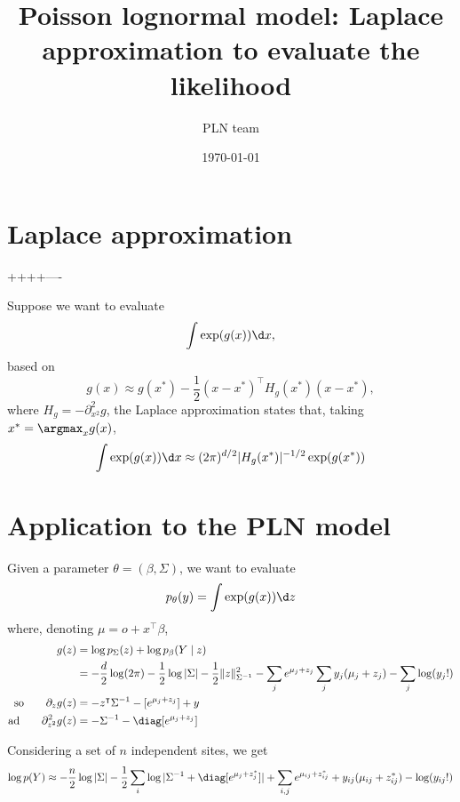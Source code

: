\documentclass{article}
\title{Poisson lognormal model: Laplace approximation to evaluate the likelihood}
\author{PLN team}
\date{\today}
\begin{document}
\maketitle

\section{Laplace approximation} ++++----

Suppose we want to evaluate
$$
\int \exp(g(x)) \d x, 
$$
based on 
$$
g(x) \approx g(x^*) - \frac12 (x - x^*)^\intercal H_g(x^*) (x - x^*),
$$
where $H_g = -\partial^2_{x^2} g$, the Laplace approximation states that, taking $x^* = \argmax_x g(x)$, 
$$
\int \exp(g(x)) \d x \approx (2\pi)^{d/2} |H_g(x^*)|^{-1/2} \exp(g(x^*))
$$

\section{Application to the PLN model}

Given a parameter $\theta = (\beta, \Sigma)$, we want to evaluate
$$
p_\theta(y) = \int \exp(g(x)) \d z
$$
where, denoting $\mu = o + x^\intercal \beta$,
\begin{align*}
 g(z) 
 & = \log p_\Sigma(z) + \log p_\beta(Y \mid z) \\
 & = - \frac{d}2 \log(2\pi) - \frac12 \log|\Sigma| - \frac12 \|z\|^2_{\Sigma^{-1}} - \sum_j e^{\mu_j + z_j} \sum_j y_j(\mu_j + z_j) - \sum_j \log(y_j !) \\
 \text{so} \qquad \partial_z g(z)
 & = - z^\intercal \Sigma^{-1} - [e^{\mu_j + z_j}] + y \\
 \text{ad} \qquad \partial^2_{z^2} g(z)
 & = - \Sigma^{-1} - \diag[e^{\mu_j + z_j}]
\end{align*}

Considering a set of $n$ independent sites, we get
$$
\log p(Y) \approx - \frac{n}2 \log |\Sigma| - \frac12 \sum_i \log|\Sigma^{-1} + \diag[e^{\mu_j + z^*_j}]| + \sum_{i, j} e^{\mu_{ij} + z^*_{ij}} + y_{ij}(\mu_{ij} + z^*_{ij}) - \log(y_{ij}!)
$$
\end{document}
